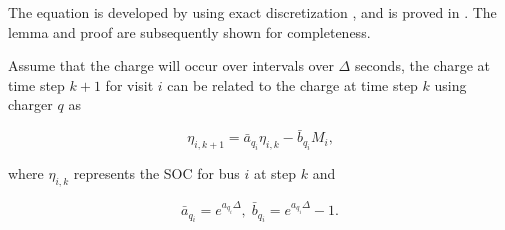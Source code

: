 \documentclass[ee,thesis]{usuthesis}
\begin{document}
The equation is developed by using exact discretization \cite{brogan-1990-moder-contr-theor}, and is proved in
\cite{whitaker-2023-a-network}. The lemma and proof are subsequently shown for completeness.

\begin{lemma}
Assume that the charge will occur over intervals over $\Delta$ seconds, the charge at time step $k+1$ for visit $i$ can be related to the charge at time step $k$ using charger $q$ as

\begin{equation}
\eta_{i,k+1} = \bar{a}_{q_i} \eta_{i,k} - \bar{b}_{q_i} M_i\text{,}
\end{equation}

where $\eta_{i, k}$ represents the SOC for bus $i$ at step $k$ and

\begin{equation}
\label{eq:nonlin-discrete-model}
\bar{a}_{q_i} = e^{a_{q_i} \Delta},\; \bar{b}_{q_i} = e^{a_{q_i} \Delta} - 1\text{.}
\end{equation}
\end{lemma}
\end{document}
